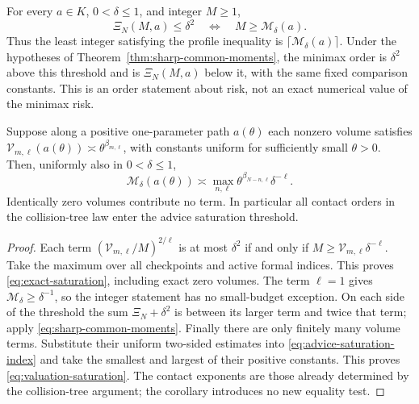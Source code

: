 \begin{corollary}
\label{cor:advice-saturation}
For every $a\in K$, $0<\delta\le1$, and integer $M\ge1$,
\begin{equation}\label{eq:exact-saturation}
 \Xi_N(M,a)\le\delta^2
       \quad\Longleftrightarrow\quad M\ge\mathcal M_\delta(a).
\end{equation}
Thus the least integer satisfying the profile inequality is
$\lceil\mathcal M_\delta(a)\rceil$. Under the hypotheses of
Theorem~\ref{thm:sharp-common-moments}, the minimax order is $\delta^2$
above this threshold and is $\Xi_N(M,a)$ below it, with the same fixed
comparison constants. This is an order statement about risk, not an
exact numerical value of the minimax risk.

Suppose along a positive one-parameter path $a(\theta)$ each nonzero
volume satisfies
$\mathcal V_{m,\ell}(a(\theta))\asymp\theta^{\beta_{m,\ell}}$,
with constants uniform for sufficiently small $\theta>0$.
Then, uniformly also in $0<\delta\le1$,
\begin{equation}\label{eq:valuation-saturation}
 \mathcal M_\delta(a(\theta))\asymp
 \max_{n,\ell}\theta^{\beta_{N-n,\ell}}\delta^{-\ell}.
\end{equation}
Identically zero volumes contribute no term. In particular all contact
orders in the collision-tree law enter the advice saturation threshold.
\end{corollary}
\begin{proof}
Each term $(\mathcal V_{m,\ell}/M)^{2/\ell}$ is at most
$\delta^2$ if and only if $M\ge\mathcal V_{m,\ell}\delta^{-\ell}$.
Take the maximum over all checkpoints and active formal indices.
This proves \eqref{eq:exact-saturation}, including exact zero volumes.
The term $\ell=1$ gives $\mathcal M_\delta\ge\delta^{-1}$, so the
integer statement has no small-budget exception. On each side of the
threshold the sum $\Xi_N+\delta^2$ is between its larger term and
twice that term; apply \eqref{eq:sharp-common-moments}.
Finally there are only finitely many volume terms. Substitute their
uniform two-sided estimates into \eqref{eq:advice-saturation-index}
and take the smallest and largest of their positive constants.
This proves \eqref{eq:valuation-saturation}. The contact exponents
are those already determined by the collision-tree argument; the
corollary introduces no new equality test.
\end{proof}

